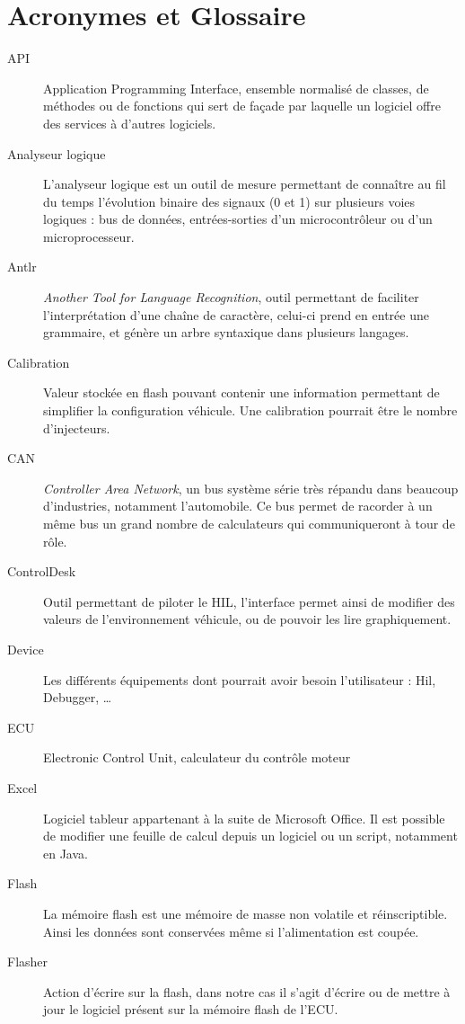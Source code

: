 \chapter{Acronymes et Glossaire}\label{glo}
\begin{description}
\item[API] Application Programming Interface, ensemble normalisé de classes, de méthodes ou de fonctions qui sert de façade par laquelle un
	logiciel offre des services à d'autres logiciels.
	\item[Analyseur logique] L'analyseur logique est un outil de mesure permettant de connaître au fil du temps l'évolution binaire des signaux (0 et 1) sur plusieurs voies logiques : bus de données, entrées-sorties d'un microcontrôleur ou d'un microprocesseur.
\item[Antlr] \textit{Another Tool for Language Recognition}, outil permettant de faciliter l'interprétation d'une chaîne de caractère, celui-ci prend en entrée une
	grammaire, et génère un arbre syntaxique dans plusieurs langages.
\item[Calibration] Valeur stockée en flash pouvant contenir une information permettant de simplifier la configuration véhicule. Une
	calibration pourrait être le nombre d'injecteurs.
\item[CAN] \textit{Controller Area Network}, un bus système série très répandu dans beaucoup d'industries, notamment l'automobile. Ce bus permet de racorder à un même bus un grand nombre de calculateurs qui communiqueront à tour de rôle.
\item[ControlDesk] Outil permettant de piloter le HIL, l'interface permet ainsi de modifier des valeurs de l'environnement véhicule, ou de
	pouvoir les lire graphiquement.
\item[Device] Les différents équipements dont pourrait avoir besoin l'utilisateur : Hil, Debugger, \ldots 
\item[ECU] Electronic Control Unit, calculateur du contrôle moteur
\item[Excel] Logiciel tableur appartenant à la suite de Microsoft Office\textregistered. Il est possible de modifier une feuille de calcul depuis un logiciel ou un script, notamment en Java. 
\item[Flash] La mémoire flash est une mémoire de masse non volatile et réinscriptible. Ainsi les données sont conservées même si l'alimentation est coupée.
\item[Flasher] Action d'écrire sur la flash, dans notre cas il s'agit d'écrire ou de mettre à jour le logiciel présent sur la mémoire flash de l'ECU.

\end{description}
